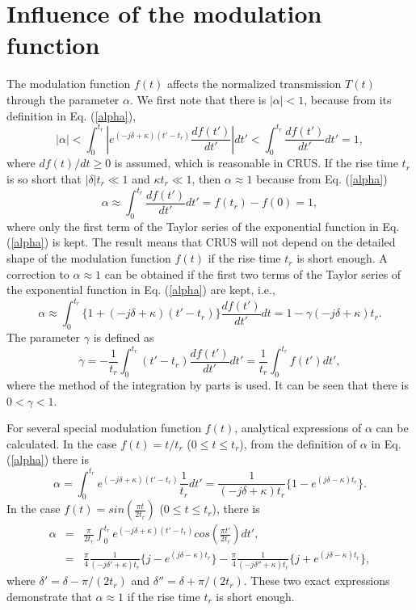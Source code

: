 \documentclass[aps,onecolumn,superscriptaddress,showpacs]{revtex4}
\begin{document}
\section{Influence of the modulation function}
The modulation function $f(t)$ affects the normalized transmission $T(t)$ through the parameter $\alpha$.
We first note that there is $|\alpha|<1$, because from its definition in Eq. (\ref{alpha}),
\begin{equation}
\left | \alpha \right |<\int_{0}^{t_r}\left | e^{(-j\delta+\kappa)(t'-t_r)} \frac{df(t')}{dt'}\right | dt'<\int_{0}^{t_r} \frac{df(t')}{dt'} dt'=1,
\end{equation}
where $df(t)/dt\geq 0$ is assumed, which is reasonable in CRUS. If the rise time $t_r$ is so short that $|\delta|t_r \ll 1$ and $\kappa t_r \ll 1$,
then $\alpha \approx 1$ because from Eq. (\ref{alpha})
\begin{equation}
\alpha  \approx \int_{0}^{t_r} \frac{df(t')}{dt'} dt'=f(t_r)-f(0)=1,
\end{equation}
where only the first term of the Taylor series of the exponential function in Eq. (\ref{alpha}) is kept.
The result means that CRUS will not depend on the detailed shape of the modulation function $f(t)$ if the rise time $t_r$ is short enough.
A correction to $\alpha \approx 1$ can be obtained if the first two terms of  the Taylor series of  the exponential function in Eq. (\ref{alpha}) are kept, i.e.,
\begin{equation}
\alpha  \approx \int_{0}^{t_r}\{1+(-j\delta+\kappa)(t'-t_r)\} \frac{df(t')}{dt'} dt=1-\gamma (-j\delta+\kappa)t_r.
\end{equation}
The parameter $\gamma$ is defined as
\begin{equation}
\gamma  =-\frac{1}{t_r} \int_{0}^{t_r}(t'-t_r) \frac{df(t')}{dt'} dt'=\frac{1}{t_r}\int_{0}^{t_r}f(t')dt',
\end{equation}
where the method of the integration by parts is used. It can be seen that there is $0<\gamma<1$.

For several special modulation function $f(t)$, analytical expressions of $\alpha$ can be calculated. In the case $f(t)=t/t_r$ ($0\leq t \leq t_r$),
from the definition of $\alpha$ in Eq. (\ref{alpha}) there is
\begin{equation}
\alpha=\int_{0}^{t_r} e^{(-j\delta+\kappa)(t'-t_r)}\frac{1}{t_r} dt'=\frac{1}{(-j\delta+\kappa)t_r}\{1-e^{(j\delta-\kappa)t_r}\}. \label{ex1}
\end{equation}
In the case $f(t)=sin(\frac{\pi t}{2 t_r})$ ($0\leq t \leq t_r$), there is
\begin{eqnarray}
\alpha&=&\frac{\pi }{2 t_r} \int_{0}^{t_r} e^{(-j\delta+\kappa)(t'-t_r)}cos(\frac{\pi t'}{2 t_r}) dt', \\
&=&\frac{\pi }{4}\frac{1}{(-j\delta'+\kappa)t_r}\{j-e^{(j\delta-\kappa)t_r}\}-\frac{\pi }{4}\frac{1}{(-j\delta''+\kappa)t_r}\{j+e^{(j\delta-\kappa)t_r}\},
\end{eqnarray}
where $\delta'=\delta-\pi /(2 t_r)$ and $\delta''=\delta+\pi /(2 t_r)$. These two exact expressions demonstrate that $\alpha \approx 1$
if the rise time $t_r$ is short enough.
\end{document}
